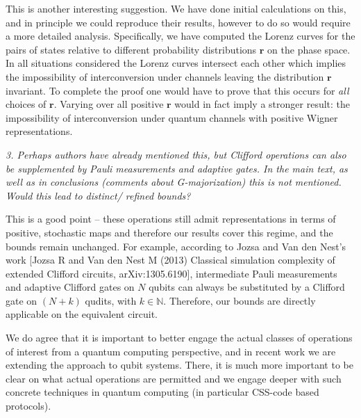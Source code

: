 \documentclass[11pt]{letter}
\begin{document}
This is another interesting suggestion.  We have done initial calculations on this,  and in principle we could reproduce their results, however to do so would require a more detailed analysis. Specifically,  we have computed the Lorenz curves for the pairs of states relative to different probability distributions $\mathbf{r}$ on the phase space. In all situations considered the Lorenz curves intersect each other which implies the impossibility of interconversion under channels leaving the distribution $\mathbf{r}$ invariant.  To complete the proof one would have to prove that this occurs for \emph{all} choices of $\mathbf{r}$. 
Varying over all positive $\mathbf{r}$ would in fact imply a stronger result: the impossibility of interconversion under quantum channels with positive Wigner representations.

\textit{3. Perhaps authors have already mentioned this, but Clifford operations can also be supplemented by Pauli measurements and adaptive gates. In the main text, as well as in conclusions (comments about G-majorization) this is not mentioned. Would this lead to distinct/ refined bounds?}

This is a good point -- these operations still admit representations in terms of positive, stochastic maps and therefore our results cover this regime, and the bounds remain unchanged. 
For example, according to Jozsa and Van den Nest's work [Jozsa R and Van den Nest M (2013) Classical simulation complexity of extended Clifford circuits, arXiv:1305.6190], intermediate Pauli measurements and adaptive Clifford gates on $N$ qubits can always be substituted by a Clifford gate on $(N+k)$ qudits, with $k \in \mathbb{N}$.
Therefore, our bounds are directly applicable on the equivalent circuit.

We do agree that it is important to better engage the actual classes of operations of interest from a quantum computing perspective, and in recent work we are extending the approach to qubit systems. There, it is much more important to be clear on what actual operations are permitted and we engage deeper with such concrete techniques in quantum computing (in particular CSS-code based protocols).
\end{document}
